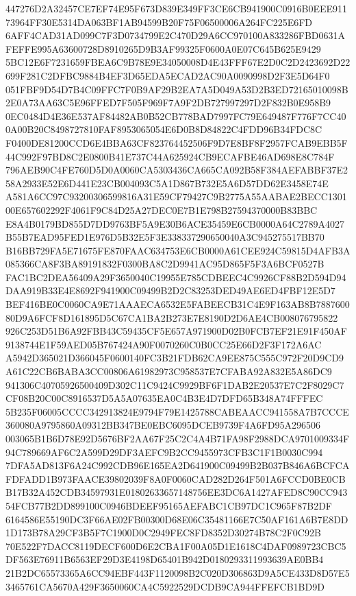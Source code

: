 \documentclass[UTF8,fontset=fandol,zihao=-4,a4paper]{ctexart}
\begin{document}
{{447276D2A32457CE7EF74E95F673D839E349FF3CE6CB941900C0916B0EEE91173964FF30E5314DA063BF1AB94599B20F75F06500006A264FC225E6FD
6AFF4CAD31AD099C7F3D0734799E2C470D29A6CC970100A833286FBD0631AFEFFE995A63600728D8910265D9B3AF99325F0600A0E07C645B625E9429
5BC12E6F7231659FBEA6C9B78E9E34050008D4E43FFF67E2D0C2D2423692D22699F281C2DFBC9884B4EF3D65EDA5ECAD2AC90A0090998D2F3E5D64F0
051FBF9D54D7B4C09FFC7F0B9AF29B2EA7A5D049A53D2B3ED72165010098B2E0A73AA63C5E96FFED7F505F969F7A9F2DB727997297D2F832B0E958B9
0EC0484D4E36E537AF84482AB0B52CB778BAD7997FC79E649487F776F7CC400A00B20C8498727810FAF8953065054E6D0B8D84822C4FDD96B34FDC8C
F0400DE81200CCD6E4BBA63CF823764452506F9D7E8BF8F2957FCAB9EBB5F44C992F97BD8C2E0800B41E737C44A625924CB9ECAFBE46AD698E8C784F
796AEB90C4FE760D5D0A0060CA5303436CA665CA092B58F384AEFABBF37E258A2933E52E6D441E23CB004093C5A1D867B732E5A6D57DD62E3458E74E
A581A6CC97C93200306599816A31E59CF79427C9B2775A55AABAE2BECC130100E657602292F4061F9C84D25A27DEC0E7B1E798B27594370000B83BBC
E8A4B0179BD855D7DD9763BF5A9E30B6ACE35459E6CB0000A64C2789A4027B55B7EAD95FED1E976D5B32E5F3E338337290650040A3C945275517BB70
B16BB729FA5E71675FE870FAAC634753E6CB0000A61CEE924C59815D4AFB3A085366CA8F3BA89191832F0300BA8C2D9941AC95D865F5F3A6BCF0527B
FAC1BC2DEA56409A29F3650040C19955E785CDBEEC4C9926CF88B2D594D94DAA919B33E4E8692F941900C09499B2D2C83253DED49AE6ED4FBF12E5D7
BEF416BE0C0060CA9E71AAAECA6532E5FABEECB31C4E9F163AB8B788760080D9A6FCF8D161895D5C67CA1BA2B273E7E8190D2D6AE4CB008076795822
926C253D51B6A92FBB43C59435CF5E657A971900D02B0FCB7EF21E91F450AF9138744E1F59AED05B767424A90F0070260C0B0CC25E66D2F3F172A6AC
A5942D365021D366045F0600140FC3B21FDB62CA9EE875C555C972F20D9CD9A61C22CB6BABA3CC00806A61982973C958537E7CFABA92A832E5A86DC9
941306C40705926500409D302C11C9424C9929BF6F1DAB2E20537E7C2F8029C7CF08B20C00C8916537D5A5A07635EA0C4B3E4D7DFD65B348A74FFFEC
5B235F06005CCCC342913824E9794F79E1425788CABEAACC941558A7B7CCCE360080A9795860A09312BB347BE0EBC6095DCEB9739F4A6FD95A296506
003065B1B6D78E92D5676BF2AA67F25C2C4A4B71FA98F2988DCA9701009334F94C789669AF6C2A599D29DF3AEFC9B2CC9455973CFB3C1F1B0030C994
7DFA5AD813F6A24C992CDB96E165EA2D641900C09499B2B037B846A6BCFCAFDFADD1B973FAACE39802039F8A0F0060CAD282D264F501A6FCCD0BE0CB
B17B32A452CDB34597931E01802633657148756EE3DC6A1427AFED8C90CC94354FCB77B2DD899100C0946BDEEF95165AEFABC1CB97DC1C965F87B2DF
6164586E55190DC3F66AE02FB00300D68E06C35481166E7C50AF161A6B7E8DD1D173B78A29CF3B5F7C1900D0C2949FEC8FD8352D30274B78C2F0C92B
70E522F7DACC8119DECF600D6E2CBA1F00A05D1E1618C4DAF0989723CBC5DF563E76911B6563EF29D3E4198D65401B942D0180293311993639AE0BB4
21B2DC65573365A6CC94EBF443F1120098B2C020D306863D9A5CE433D8D57E53465761CA5670A429F3650060CA4C5922529DCDB9CA944FFEFCB1BD9D
}}
\end{document}
